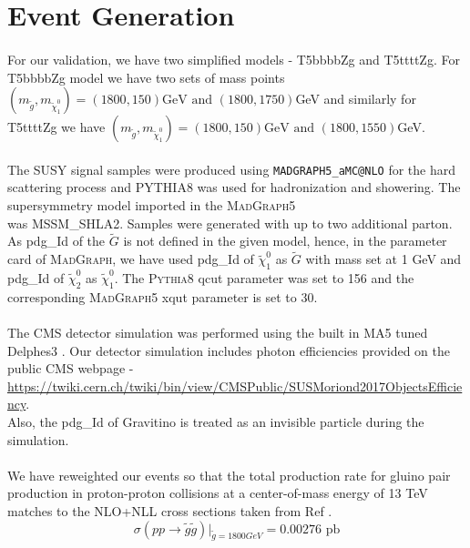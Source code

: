 \documentclass[a4paper, 10pt]{article}
\begin{document}
\section{Event Generation}
\paragraph{}
For our validation, we have two simplified models - T5bbbbZg and T5ttttZg. For T5bbbbZg model we have two sets of mass points $(m_{\tilde{g}},m_{\tilde{\chi}_{1}^{0}}) = (1800,150)\text{GeV and } (1800,1750)$GeV and similarly for T5ttttZg we have $(m_{\tilde{g}},m_{\tilde{\chi}_{1}^{0}}) = (1800,150)\text{GeV and } (1800,1550)$GeV. 
\paragraph{}
The SUSY signal samples were produced using \texttt{MADGRAPH5\_aMC@NLO} \cite{madgraph} for the hard scattering process and PYTHIA8 \cite{pythia} was used for hadronization and showering. The supersymmetry model imported in the \textsc{MadGraph5} \\was MSSM\_SHLA2. Samples were generated with up to two additional parton. As pdg\_Id of the $\tilde{G}$ is not defined in the given model, hence, in the parameter card of \textsc{MadGraph}, we have used pdg\_Id of $\tilde{\chi}_1^0 $ as $\tilde{G}$ with mass set at 1 GeV and pdg\_Id of $\tilde{\chi}_2^0 $ as $\tilde{\chi}_1^0 $.  The \textsc{Pythia8} qcut parameter was set to 156 and the corresponding \textsc{MadGraph5} xqut parameter is set to 30. 
\paragraph{}
The CMS detector simulation was performed using the built in MA5 tuned Delphes3 \cite{delphes}. Our detector simulation includes photon efficiencies provided on the public CMS webpage - \\
\href{https://twiki.cern.ch/twiki/bin/view/CMSPublic/SUSMoriond2017ObjectsEfficiency}{https://twiki.cern.ch/twiki/bin/view/CMSPublic/SUSMoriond2017ObjectsEfficiency}. \\Also, the pdg\_Id of Gravitino is treated as an invisible particle during the simulation. 
\paragraph{}
We have reweighted our events so that the total production rate for gluino pair production in proton-proton collisions at a center-of-mass energy of 13 TeV matches to the NLO+NLL cross sections taken from Ref \cite{crosssection}. $$ \sigma(p p \to \tilde{g} \tilde{g})\vert_{\tilde{g} = 1800 GeV} = 0.00276 \text{ pb} $$
\end{document}
